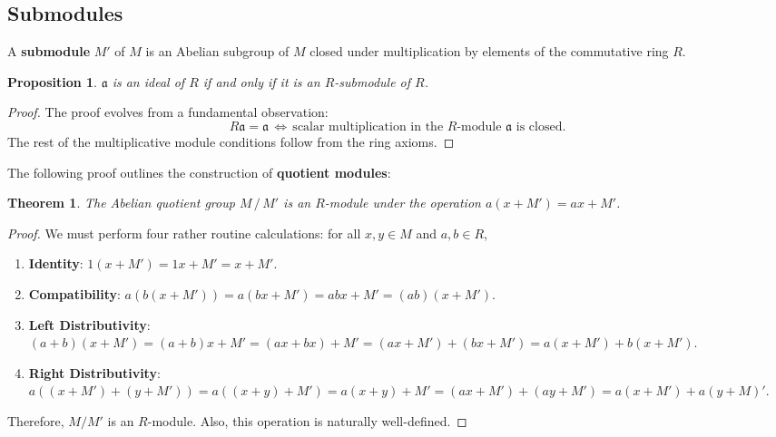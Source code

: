 \documentclass[11pt]{article}
\newtheorem{theorem}{Theorem}
\newtheorem{proposition}{Proposition}
\begin{document}

\subsection{Submodules}

A \textbf{submodule} $M'$ of $M$ is an Abelian subgroup of $M$ closed under multiplication by elements of the commutative ring $R$. 

\begin{adjustwidth}{0.5cm}{}
  \begin{proposition}
    $\mathfrak{a}$ is an ideal of $R$ if and only if it is an $R$-submodule of $R$.
  \end{proposition}
  \begin{proof}
    The proof evolves from a fundamental observation:
    \[
      R \mathfrak{a} = \mathfrak{a} \, \iff \, \text{scalar multiplication in the $R$-module $\mathfrak{a}$ is closed}.
    \]
    The rest of the multiplicative module conditions follow from the ring axioms.
  \end{proof}
\end{adjustwidth}

The following proof outlines the construction of \textbf{quotient modules}:

\begin{adjustwidth}{0.5cm}{}
	\begin{theorem}
		The Abelian quotient group $M \, / \, M'$ is an $R$-module under the operation $a(x + M') = ax + M'$.
	\end{theorem}
	\begin{proof}
		We must perform four rather routine calculations: for all $x, y \in M$ and $a, b \in R$,
		\begin{enumerate}
      \item \textbf{Identity}: $1(x + M') = 1x + M' = x + M'$.
      \item \textbf{Compatibility}: $a(b(x + M')) = a(bx + M') = abx + M' = (ab)(x + M')$.
			\item \textbf{Left Distributivity}: $(a + b)(x + M') = (a + b)x + M' = (ax + bx) + M' = (ax + M') + (bx + M') = a(x + M') + b(x + M')$.
			\item \textbf{Right Distributivity}: $a((x + M') + (y + M')) = a((x + y) + M') = a(x + y) + M' = (ax + M') + (ay + M') = a(x + M') + a(y + M)'$.
		\end{enumerate}
		Therefore, $M / M'$ is an $R$-module. Also, this operation is naturally well-defined.
	\end{proof}
\end{adjustwidth}
\end{document}
